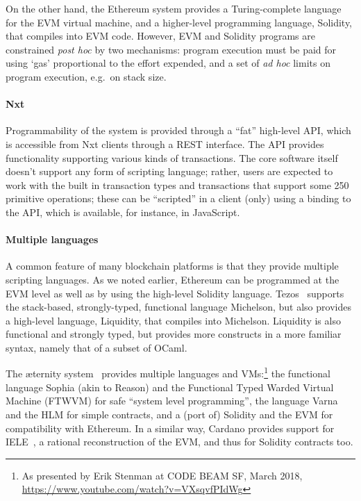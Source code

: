 \documentclass[
      acmsmall
    , screen
    , review=true
  ]{acmart}
\begin{document}
On the other hand, the Ethereum system provides a Turing-complete language for the EVM virtual machine, and a higher-level programming language, Solidity, that compiles into EVM code. However, EVM and Solidity programs are constrained \emph{post hoc} by two mechanisms: program execution must be paid for using `gas' proportional to the effort expended, and a set of \emph{ad hoc} limits on program execution, e.g.\ on stack size.

\paragraph{Nxt}

Programmability of the system is provided through a ``fat'' high-level API, which is accessible from Nxt clients through a REST interface. The API provides functionality supporting various kinds of transactions. The core software itself doesn't support any form of scripting language; rather, users are expected to work with the built in transaction types and transactions that support some 250 primitive operations; these can be ``scripted'' in a client (only) using a binding to the API, which is available, for instance, in JavaScript.

\paragraph{Multiple languages}

A common feature of many blockchain platforms is that they provide multiple scripting languages. As we noted earlier, Ethereum can be programmed at the EVM level as well as by using the high-level Solidity language. Tezos~\cite{tezos-white-paper} supports the stack-based, strongly-typed, functional language Michelson, but also provides a high-level language, Liquidity, that compiles into Michelson. Liquidity is also functional and strongly typed, but provides more constructs in a more familiar syntax, namely that of a subset of OCaml. 

The \ae{}ternity system~\cite{aeternity} provides multiple languages and VMs:\footnote{As presented by Erik Stenman at CODE BEAM SF, March 2018, \url{https://www.youtube.com/watch?v=VXsqvfPIdWg}} the functional language  Sophia (akin to Reason) and the Functional Typed Warded Virtual Machine (FTWVM) for safe ``system level programming'', the language Varna and the HLM for simple contracts, and a (port of) Solidity and the EVM for compatibility with Ethereum. In a similar way, Cardano provides support for IELE~, a rational reconstruction of the EVM, and thus for Solidity contracts too. 
\end{document}

